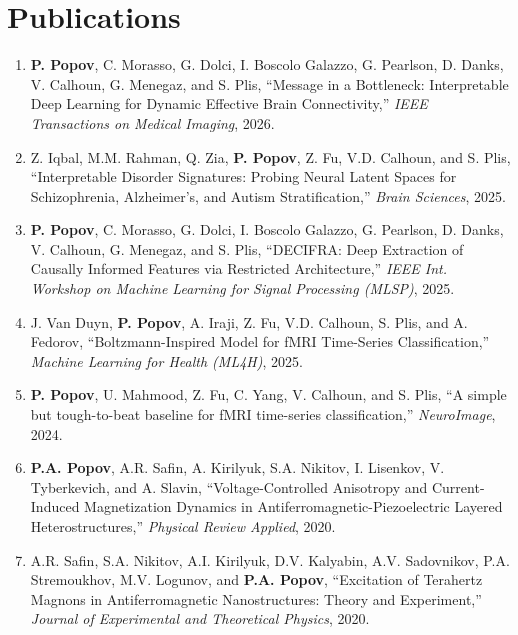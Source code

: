 \documentclass[11pt,a4paper]{article}
\newcommand{\me}[1]{\textbf{#1}} %
\begin{document}
\section*{Publications}
\begin{enumerate}[leftmargin=*,itemsep=4pt,label=\arabic*.]

\item \me{P. Popov}, C. Morasso, G. Dolci, I. Boscolo Galazzo, G. Pearlson, D. Danks, V. Calhoun, G. Menegaz, and S. Plis, ``Message in a Bottleneck: Interpretable Deep Learning for Dynamic Effective Brain Connectivity,'' \textit{IEEE Transactions on Medical Imaging}, 2026.

\item Z. Iqbal, M.M. Rahman, Q. Zia, \me{P. Popov}, Z. Fu, V.D. Calhoun, and S. Plis, ``Interpretable Disorder Signatures: Probing Neural Latent Spaces for Schizophrenia, Alzheimer's, and Autism Stratification,'' \textit{Brain Sciences}, 2025.

\item \me{P. Popov}, C. Morasso, G. Dolci, I. Boscolo Galazzo, G. Pearlson, D. Danks, V. Calhoun, G. Menegaz, and S. Plis, ``DECIFRA: Deep Extraction of Causally Informed Features via Restricted Architecture,'' \textit{IEEE Int. Workshop on Machine Learning for Signal Processing (MLSP)}, 2025.

\item J. Van Duyn, \me{P. Popov}, A. Iraji, Z. Fu, V.D. Calhoun, S. Plis, and A. Fedorov, ``Boltzmann-Inspired Model for fMRI Time-Series Classification,'' \textit{Machine Learning for Health (ML4H)}, 2025.

\item \me{P. Popov}, U. Mahmood, Z. Fu, C. Yang, V. Calhoun, and S. Plis, ``A simple but tough-to-beat baseline for fMRI time-series classification,'' \textit{NeuroImage}, 2024.

\item \me{P.A. Popov}, A.R. Safin, A. Kirilyuk, S.A. Nikitov, I. Lisenkov, V. Tyberkevich, and A. Slavin, ``Voltage-Controlled Anisotropy and Current-Induced Magnetization Dynamics in Antiferromagnetic-Piezoelectric Layered Heterostructures,'' \textit{Physical Review Applied}, 2020.

\item A.R. Safin, S.A. Nikitov, A.I. Kirilyuk, D.V. Kalyabin, A.V. Sadovnikov, P.A. Stremoukhov, M.V. Logunov, and \me{P.A. Popov}, ``Excitation of Terahertz Magnons in Antiferromagnetic Nanostructures: Theory and Experiment,'' \textit{Journal of Experimental and Theoretical Physics}, 2020.


\end{enumerate}
\end{document}

